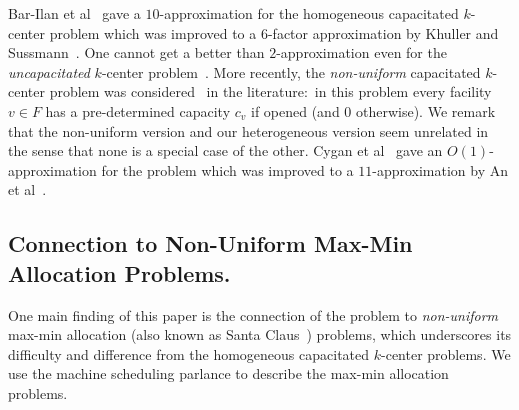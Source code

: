 Bar-Ilan et al~\cite{Bar-IlanKP93} gave a $10$-approximation for the homogeneous capacitated $k$-center problem which was improved to a $6$-factor approximation by Khuller and Sussmann~\cite{KhullerS00}. One cannot get a better than $2$-approximation even for the {\em uncapacitated} $k$-center problem~\cite{HochbaumS85}. More recently, the {\em non-uniform} capacitated $k$-center problem was considered~\cite{CyganHK12,AnBCGMS14} in the literature:~in this problem every facility $v\in F$ has a pre-determined capacity $c_v$ if opened (and $0$ otherwise). We remark that the non-uniform version and our heterogeneous version seem unrelated in the sense that none is a special case of the other.
Cygan et al~\cite{CyganHK12} gave an $O(1)$-approximation for the problem which was improved to a $11$-approximation by An et al~\cite{AnBCGMS14}.




%
%
%
\subsection*{Connection to Non-Uniform Max-Min Allocation Problems.}
One main finding of this paper is the connection of the \mckc problem to {\em non-uniform} max-min allocation (also known as Santa Claus~\cite{BansalS06}) problems, which
 underscores its difficulty and difference from  the homogeneous capacitated $k$-center problems. %
We use the machine scheduling parlance to describe the max-min allocation problems.

